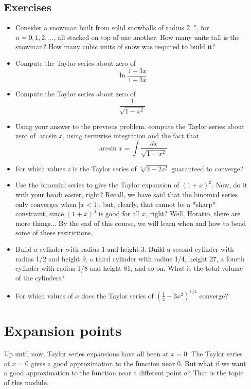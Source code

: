 \documentclass[twoside,openright,titlepage,a4paper]{book}
\begin{document}
\begin{sloppypar}
\subsection{Exercises}
\begin{itemize}
\item Consider a snowman built from solid snowballs of radius $2^{-n}$, for $n=0,1,2,\ldots $, all stacked on top of one another. How many units tall is the snowman? How many cubic units of snow was required to build it?
\item Compute the Taylor series about zero of \[ \ln\frac{1+3x}{1-3x} \]
\item Compute the Taylor series about zero of \[ \frac{1}{\sqrt{1-x^2}} \]
\item Using your answer to the previous problem, compute the Taylor series about zero of $\arcsin x$, using termwise integration and the fact that \[ \arcsin x = \int \frac{dx}{\sqrt{1-x^2}} \]
\item For which values $z$ is the Taylor series of $\sqrt[4]{3-2z^2}$ guaranteed to converge?
\item Use the binomial series to give the Taylor expansion of $(1+x)^3$. Now, do it with your head: easier, right? Recall, we have said that the binomial series only converges when $|x<1|$, but, clearly, that cannot be a *sharp* constraint, since $(1+x)^3$ is good for all $x$, right? Well, Horatio, there are more things... By the end of this course, we will learn when and how to bend some of these restrictions.
\item Build a cylinder with radius 1 and height 3. Build a second cylinder with radius 1/2 and height 9, a third cylinder with radius 1/4, height 27, a fourth cylinder with radius 1/8 and height 81, and so on. What is the total volume of the cylinders?
\item For which values of $x$ does the Taylor series of $(\frac{1}{4}-3x^2)^{1/4}$ converge?
\end{itemize}

\section{Expansion points} \label{ChFunctionsSecExpansionPoints}
Up until now, Taylor series expansions have all been at $x=0$. The Taylor series at $x=0$ gives a good approximation to the function near 0. But what if we want a good approximation to the function near a different point $a$? That is the topic of this module.

\end{sloppypar}
\end{document}
